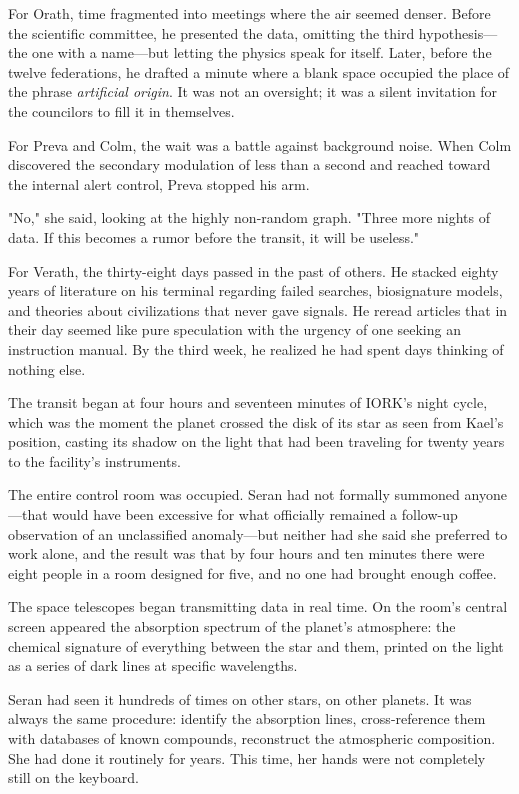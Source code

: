 \documentclass[11pt,a5paper,twoside]{book}
\begin{document}
For Orath, time fragmented into meetings where the air seemed denser. Before the scientific committee, he presented the data, omitting the third hypothesis—the one with a name—but letting the physics speak for itself. Later, before the twelve federations, he drafted a minute where a blank space occupied the place of the phrase \textit{artificial origin}. It was not an oversight; it was a silent invitation for the councilors to fill it in themselves.

For Preva and Colm, the wait was a battle against background noise. When Colm discovered the secondary modulation of less than a second and reached toward the internal alert control, Preva stopped his arm.

"No," she said, looking at the highly non-random graph. "Three more nights of data. If this becomes a rumor before the transit, it will be useless."

For Verath, the thirty-eight days passed in the past of others. He stacked eighty years of literature on his terminal regarding failed searches, biosignature models, and theories about civilizations that never gave signals. He reread articles that in their day seemed like pure speculation with the urgency of one seeking an instruction manual. By the third week, he realized he had spent days thinking of nothing else.

The transit began at four hours and seventeen minutes of IORK's night cycle, which was the moment the planet crossed the disk of its star as seen from Kael’s position, casting its shadow on the light that had been traveling for twenty years to the facility's instruments.

The entire control room was occupied. Seran had not formally summoned anyone—that would have been excessive for what officially remained a follow-up observation of an unclassified anomaly—but neither had she said she preferred to work alone, and the result was that by four hours and ten minutes there were eight people in a room designed for five, and no one had brought enough coffee.

The space telescopes began transmitting data in real time. On the room's central screen appeared the absorption spectrum of the planet's atmosphere: the chemical signature of everything between the star and them, printed on the light as a series of dark lines at specific wavelengths.

Seran had seen it hundreds of times on other stars, on other planets. It was always the same procedure: identify the absorption lines, cross-reference them with databases of known compounds, reconstruct the atmospheric composition. She had done it routinely for years. This time, her hands were not completely still on the keyboard.
\end{document}
